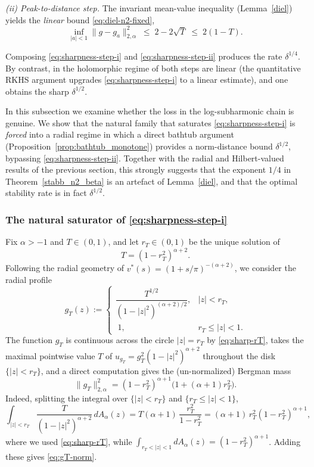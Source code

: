 \documentclass[a4paper,10pt]{amsart}
\begin{document}
\smallskip\noindent\emph{(ii) Peak-to-distance step.} The invariant mean-value
inequality (Lemma~\ref{diel}) yields the \emph{linear} bound
\eqref{eq:diel-n2-fixed},
\begin{equation}\label{eq:sharpness-step-ii}
\inf_{|a|<1}\|g-g_a\|_{2,\alpha}^2\;\le\;2-2\sqrt T\;\le\;2(1-T).
\end{equation}

\smallskip
Composing \eqref{eq:sharpness-step-i} and \eqref{eq:sharpness-step-ii} produces
the rate $\delta^{1/4}$. By contrast, in the holomorphic regime of
\cite{GomezKalajMelentijevicRamos2025} both steps are linear (the
quantitative RKHS argument upgrades \eqref{eq:sharpness-step-i} to a linear
estimate), and one obtains the sharp $\delta^{1/2}$.

In this subsection we examine whether the loss in the log-subharmonic chain is
genuine. We show that the natural family that saturates
\eqref{eq:sharpness-step-i} is \emph{forced} into a radial regime in which a
direct bathtub argument (Proposition~\ref{prop:bathtub_monotone}) provides a
norm-distance bound $\delta^{1/2}$, bypassing
\eqref{eq:sharpness-step-ii}. Together with the radial and Hilbert-valued
results of the previous section, this strongly suggests that
the exponent $1/4$ in Theorem~\ref{stabb_n2_beta} is an artefact of
Lemma~\ref{diel}, and that the optimal stability rate is in fact $\delta^{1/2}$.

\subsubsection*{The natural saturator of \eqref{eq:sharpness-step-i}}

Fix $\alpha>-1$ and $T\in(0,1)$, and let $r_T\in(0,1)$ be the unique solution of
\begin{equation}\label{eq:sharp-rT}
T=(1-r_T^2)^{\alpha+2}.
\end{equation}
Following the radial geometry of $v^*(s)=(1+s/\pi)^{-(\alpha+2)}$, we consider
the radial profile
\begin{equation}\label{eq:saturating-profile}
g_T(z):=
\begin{cases}
\dfrac{T^{1/2}}{(1-|z|^2)^{(\alpha+2)/2}},& |z|<r_T,\\[8pt]
\;1,& r_T\le |z|<1.
\end{cases}
\end{equation}
The function $g_T$ is continuous across the circle $|z|=r_T$ by
\eqref{eq:sharp-rT}, takes the maximal pointwise value $T$ of
$u_{g_T}=g_T^2(1-|z|^2)^{\alpha+2}$ throughout the disk $\{|z|<r_T\}$, and a
direct computation gives the (un-normalized) Bergman mass
\begin{equation}\label{eq:gT-norm}
\|g_T\|_{2,\alpha}^2
=
(1-r_T^2)^{\alpha+1}\bigl(1+(\alpha+1)r_T^2\bigr).
\end{equation}
Indeed, splitting the integral over $\{|z|<r_T\}$ and $\{r_T\le|z|<1\}$,
\[
\int_{|z|<r_T}\frac{T}{(1-|z|^2)^{\alpha+2}}\,dA_\alpha(z)
=
T(\alpha+1)\,\frac{r_T^2}{1-r_T^2}
=
(\alpha+1)\,r_T^2(1-r_T^2)^{\alpha+1},
\]
where we used \eqref{eq:sharp-rT}, while
$\int_{r_T<|z|<1}dA_\alpha(z)=(1-r_T^2)^{\alpha+1}$. Adding these gives
\eqref{eq:gT-norm}.
\end{document}
